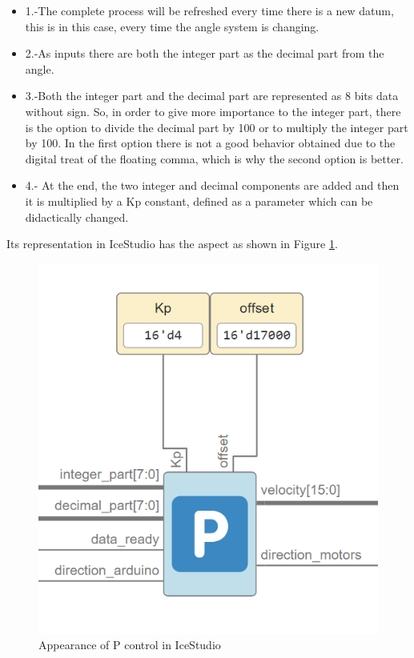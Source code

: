 \begin{itemize}
	\item 1.-The complete process will be refreshed every time there is a new datum, this is in this case, every time the angle system is changing.
	\item 2.-As inputs there are both the integer part as the decimal part from the angle.
	\item 3.-Both the integer part and the decimal part are represented as 8 bits data without sign. So, in order to give more importance to the integer part, there is the option to divide the decimal part by 100 or to multiply the integer part by 100. In the first option there is not a good behavior obtained due to the digital treat of the floating comma, which is why the second option is better.
	\item 4.- At the end, the two integer and decimal components are added and then it is multiplied by a Kp constant, defined as a parameter which can be didactically changed.
\end{itemize}

Its representation in IceStudio has the aspect as shown in Figure \ref{fig:Pcontrol}.

\begin{figure}[H]
	\center
	\includegraphics[scale=0.5]{imagenes/Balancing_robot/Pcontrol}
	\caption{Appearance of P control in IceStudio}
	\label{fig:Pcontrol}
\end{figure}
\newpage
